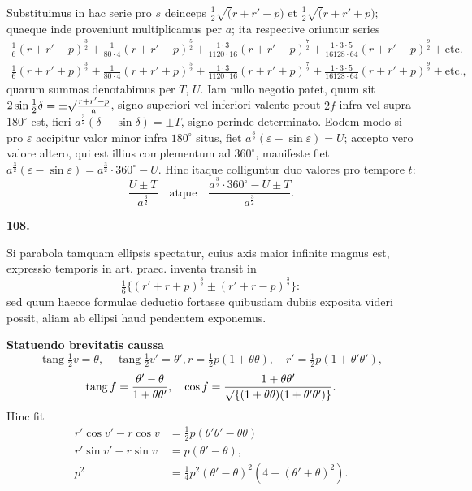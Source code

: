 \documentclass[12pt,a4paper]{article}
\DeclareMathOperator{\tang}{tang}
\begin{document}
Substituimus in hac serie pro $s$ deinceps $\tfrac{1}{2}\surd(r+r'-p)$ et
$\tfrac{1}{2}\surd(r+r'+p)$; quaeque inde proveniunt multiplicamus per $a$; ita respective oriuntur series
\begin{gather*}
\tfrac{1}{6}(r+r'-p)^{\frac{3}{2}} + \tfrac{1}{80\cdot 4}(r+r'-p)^{\frac{5}{2}} + \tfrac{1\cdot 3}{1120\cdot 16}(r+r'-p)^{\frac{7}{2}} + \tfrac{1\cdot 3\cdot 5}{16128\cdot 64}(r+r'-p)^{\frac{9}{2}} + \text{etc.} \\
\tfrac{1}{6}(r+r'+p)^{\frac{3}{2}} + \tfrac{1}{80\cdot 4}(r+r'+p)^{\frac{5}{2}} + \tfrac{1\cdot 3}{1120\cdot 16}(r+r'+p)^{\frac{7}{2}} + \tfrac{1\cdot 3\cdot 5}{16128\cdot 64}(r+r'+p)^{\frac{9}{2}} + \text{etc.},
\end{gather*}
quarum summas denotabimus per $T$, $U$. Iam nullo negotio patet, quum sit
$2\sin\tfrac{1}{2}\delta = \pm\surd\frac{r+r'-p}{a}$, signo superiori vel inferiori valente prout $2f$ infra vel
supra $180^\circ$ est, fieri $a^{\frac{3}{2}}(\delta - \sin\delta) = \pm T$, signo perinde determinato. Eodem
modo si pro $\varepsilon$ accipitur valor minor infra $180^\circ$ situs, fiet $a^{\frac{3}{2}}(\varepsilon - \sin\varepsilon) = U$;
accepto vero valore altero, qui est illius complementum ad $360^\circ$, manifeste
fiet $a^{\frac{3}{2}}(\varepsilon - \sin\varepsilon) = a^{\frac{3}{2}}\cdot 360^\circ - U$. Hinc itaque colliguntur duo valores pro tempore $t$:
\[
\frac{U \pm T}{a^{\frac{3}{2}}} \quad \text{atque} \quad \frac{a^{\frac{3}{2}}\cdot 360^\circ - U \pm T}{a^{\frac{3}{2}}}.
\]

\bigskip
\noindent\textbf{108.}

Si parabola tamquam ellipsis spectatur, cuius axis maior infinite magnus est,
expressio temporis in art. praec. inventa transit in
\[
\tfrac{1}{6}\{(r'+r+p)^{\frac{3}{2}} \pm (r'+r-p)^{\frac{3}{2}}\}:
\]
sed quum haecce formulae deductio fortasse quibusdam dubiis exposita videri
possit, aliam ab ellipsi haud pendentem exponemus.


\bigskip
\noindent\textbf{Statuendo brevitatis caussa}
\[
\tang\tfrac{1}{2}v = \theta, \quad \tang\tfrac{1}{2}v' = \theta',
r = \tfrac{1}{2}p(1 + \theta\theta), \quad r' = \tfrac{1}{2}p(1 + \theta'\theta'),
\]
\[
\tang f = \frac{\theta' - \theta}{1 + \theta\theta'}, \quad \cos f = \frac{1 + \theta\theta'}{\surd\{(1+\theta\theta)(1+\theta'\theta')\}}.
\]
Hinc fit
\begin{align*}
r'\cos v' - r\cos v &= \tfrac{1}{2}p(\theta'\theta' - \theta\theta) \\
r'\sin v' - r\sin v &= p(\theta' - \theta), \\
p^2 &= \tfrac{1}{4}p^2(\theta' - \theta)^2(4 + (\theta' + \theta)^2).
\end{align*}
\end{document}
